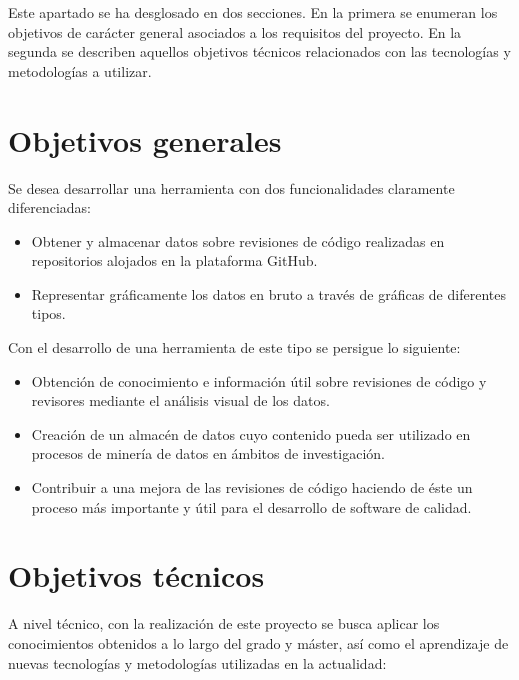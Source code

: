 
Este apartado se ha desglosado en dos secciones. En la primera se enumeran los objetivos de carácter general asociados a los requisitos del proyecto. En la segunda se describen aquellos objetivos técnicos relacionados con las tecnologías y metodologías a utilizar.

\section{Objetivos generales}

Se desea desarrollar una herramienta con dos funcionalidades claramente diferenciadas:

\begin{itemize}
	\item Obtener y almacenar datos sobre revisiones de código realizadas en repositorios alojados en la plataforma GitHub.
	\item Representar gráficamente los datos en bruto a través de gráficas de diferentes tipos.
\end{itemize}

Con el desarrollo de una herramienta de este tipo se persigue lo siguiente:

\begin{itemize}
	\item Obtención de conocimiento e información útil sobre revisiones de código y revisores mediante el análisis visual de los datos.
	\item Creación de un almacén de datos cuyo contenido pueda ser utilizado en procesos de minería de datos en ámbitos de investigación.
	\item Contribuir a una mejora de las revisiones de código haciendo de éste un proceso más importante y útil para el desarrollo de software de calidad.
\end{itemize}


\section{Objetivos técnicos}

A nivel técnico, con la realización de este proyecto se busca aplicar los conocimientos obtenidos a lo largo del grado y máster, así como el aprendizaje de nuevas tecnologías y metodologías utilizadas en la actualidad:

